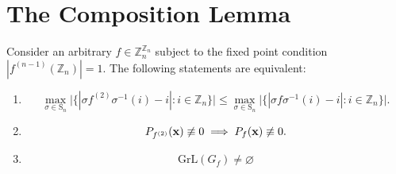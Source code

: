\section{The Composition Lemma}

\begin{prop}\label{prop:composition-lemma-ineq}
Consider an arbitrary $f\in\mathbb{Z}_{n}^{\mathbb{Z}_{n}}$ subject to the fixed point condition
$\left|f^{\left(n-1\right)}\left(\mathbb{Z}_{n}\right)\right|=1$. The following statements are equivalent:
\begin{enumerate}
    \item 
    \[
    \max_{\sigma\in\text{S}_{n}}\big|\{|\sigma f^{(2)}\sigma^{-1}(i)-i|:i\in\mathbb{Z}_{n}\}\big|\le\max_{\sigma\in\text{S}_{n}}\big|\{|\sigma f\sigma^{-1}(i)-i|:i\in\mathbb{Z}_{n}\}\big|.
    \]
    \item
    \[
    P_{f^{(2)}} ({\bf x}) \not\equiv 0  \implies  P_{f} ({\bf x}) \not\equiv 0.
    \]
    \item 
    \[
    \text{GrL}(G_f) \neq \varnothing
    \]
\end{enumerate}    
\end{prop}
